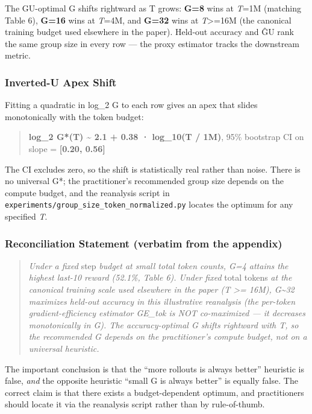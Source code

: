 \documentclass[
  american,
  11pt,
  a4paper,
  oneside]{report}
\begin{document}
The GU-optimal G shifts rightward as T grows: \textbf{G=8} wins at
\emph{T}=1M (matching Table 6), \textbf{G=16} wins at \emph{T}=4M, and
\textbf{G=32} wins at \emph{T}\textgreater=16M (the canonical training
budget used elsewhere in the paper). Held-out accuracy and ĜU rank the
same group size in every row --- the proxy estimator tracks the
downstream metric.

\subsubsection{Inverted-U Apex Shift}\label{inverted-u-apex-shift}

Fitting a quadratic in log\_2 G to each row gives an apex that slides
monotonically with the token budget:

\begin{quote}
\textbf{log\_2 G*(T) \textasciitilde{} 2.1 + 0.38 · log\_10(T / 1M)},
95\% bootstrap CI on slope = \textbf{{[}0.20, 0.56{]}}
\end{quote}

The CI excludes zero, so the shift is statistically real rather than
noise. There is no universal G*; the practitioner's recommended group
size depends on the compute budget, and the reanalysis script in
\texttt{experiments/group\_size\_token\_normalized.py} locates the
optimum for any specified \emph{T}.

\subsubsection{Reconciliation Statement (verbatim from the
appendix)}\label{reconciliation-statement-verbatim-from-the-appendix}

\begin{quote}
\emph{Under a fixed} step \emph{budget at small total token counts, G=4
attains the highest last-10 reward (52.1\%, Table 6). Under fixed} total tokens
\emph{at the canonical training scale used elsewhere in the paper (T
\textgreater= 16M), G\textasciitilde32 maximizes held-out accuracy in this
illustrative reanalysis (the per-token gradient-efficiency estimator GE\_tok is
NOT co-maximized --- it decreases monotonically in G). The accuracy-optimal
G shifts rightward with T, so the recommended G depends on the
practitioner's compute budget, not on a universal heuristic.}
\end{quote}

The important conclusion is that the ``more rollouts is always better''
heuristic is false, \emph{and} the opposite heuristic ``small G is
always better'' is equally false. The correct claim is that there exists
a budget-dependent optimum, and practitioners should locate it via the
reanalysis script rather than by rule-of-thumb.
\end{document}
